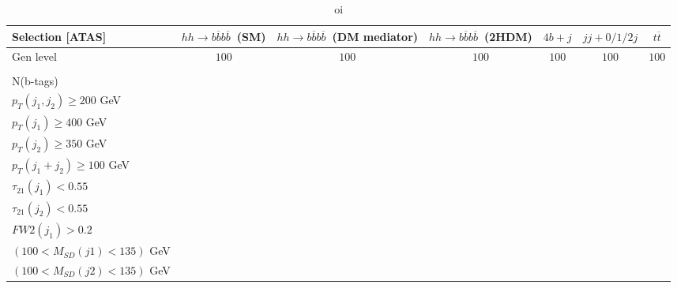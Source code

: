 \begin{landscape}
	\begin{table}
		\centering
		\caption{oi}
		\begin{tabular}{lcccccc}
			\toprule 
			\textbf{Selection [ATAS]} & $hh\rightarrow b\overline{b}b\overline{b}$~(SM) & $hh\rightarrow b\overline{b}b\overline{b}$~(DM mediator) & $hh\rightarrow b\overline{b}b\overline{b}$~(2HDM) & $4b+j$  & $jj+0/1/2 j$ & $t\overline{t}$ \\
			\midrule
			\multirow{2}{*}{Gen level} & $100$ & $100$ &$100$& $100$& $100$& $100$ \\
			&   &&  &&&\\
			\rowcolor{black!7}N(b-tags) &  &  &&&&\\
			\multirow{2}{*}{$p_T(j_1,j_2)\geq200$ GeV} &  & & &&&\\ 
			& && &&&\\
			\midrule \midrule
			\rowcolor{black!7}$p_T(j_1)\geq 400$ GeV &  &  &&&&\\ 
			$p_T(j_2)\geq 350$ GeV & &&   &&&\\
			\rowcolor{black!7}$p_T(j_1+j_2)\geq 100$ GeV &  & &  &&&\\
			$\tau_{21}(j_1)<0.55$ & & &&&&\\
			\rowcolor{black!7}$\tau_{21}(j_2)<0.55$ & & &&&&\\
			$FW2(j_1)>0.2$ & &&&&&\\
			\rowcolor{black!7}$(100<M_{SD}(j1)<135)$ GeV& &&&&&\\
			\multirow{2}{*}{$(100<M_{SD}(j2)<135)$ GeV} &  & &&&&\\
			&&&&&&\\
			\bottomrule
		\end{tabular}
	\end{table}


\end{landscape}
	



